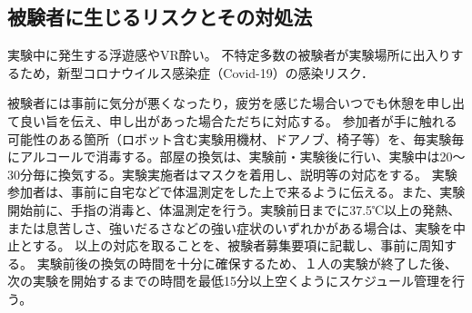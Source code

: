 \begin{small}



  \subsection{被験者に生じるリスクとその対処法}
    実験中に発生する浮遊感やVR酔い。
    不特定多数の被験者が実験場所に出入りするため，新型コロナウイルス感染症（Covid-19）の感染リスク．

    被験者には事前に気分が悪くなったり，疲労を感じた場合いつでも休憩を申し出て良い旨を伝え、申し出があった場合ただちに対応する。
    参加者が手に触れる可能性のある箇所（ロボット含む実験用機材、ドアノブ、椅子等）を、毎実験毎にアルコールで消毒する。部屋の換気は、実験前・実験後に行い、実験中は20～30分毎に換気する。実験実施者はマスクを着用し、説明等の対応をする。
    実験参加者は、事前に自宅などで体温測定をした上で来るように伝える。また、実験開始前に、手指の消毒と、体温測定を行う。実験前日までに37.5℃以上の発熱、または息苦しさ、強いだるさなどの強い症状のいずれかがある場合は、実験を中止とする。
    以上の対応を取ることを、被験者募集要項に記載し、事前に周知する。
    実験前後の換気の時間を十分に確保するため、１人の実験が終了した後、次の実験を開始するまでの時間を最低15分以上空くようにスケジュール管理を行う。


\end{small}
